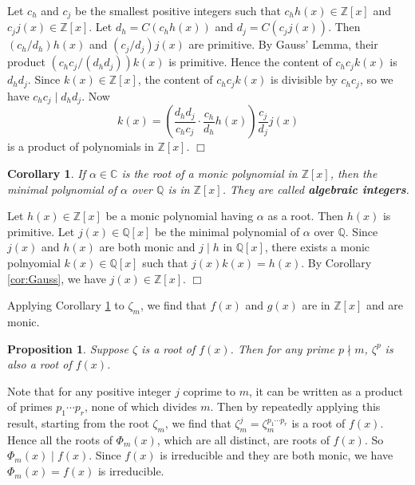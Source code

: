 \documentclass{article}
\def\Z{{\mathbb Z}}
\def\Q{{\mathbb Q}}
\def\Z{{\mathbb Z}}
\def\Q{{\mathbb Q}}
\def\C{{\mathbb C}}
\newtheorem{cor}[subsection]{Corollary}
\newtheorem{proposition}[subsection]{Proposition}
\newenvironment{proof}{\noindent {\bf Proof:}}{$\Box$ \vspace{2 ex}}
\begin{document}
\begin{proof}
    Let $c_h$ and $c_j$ be the smallest positive integers such that $c_hh(x)\in\Z[x]$ and $c_jj(x)\in\Z[x]$. Let $d_h = C(c_hh(x))$ and $d_j = C(c_jj(x))$. Then $(c_h/d_h)h(x)$ and $(c_j/d_j)j(x)$ are primitive. By Gauss' Lemma, their product $(c_hc_j/(d_hd_j))k(x)$ is primitive. Hence the content of $c_hc_jk(x)$ is $d_hd_j$. Since $k(x)\in\Z[x]$, the content of $c_hc_jk(x)$ is divisible by $c_hc_j$, so we have $c_hc_j \mid d_h d_j$. Now
    $$k(x) = \left(\frac{d_hd_j}{c_hc_j} \cdot \frac{c_h}{d_h}h(x)\right) \frac{c_j}{d_j}j(x)$$
    is a product of polynomials in $\Z[x]$.
\end{proof}

\begin{cor}\label{cor:alg}
    If $\alpha\in\C$ is the root of a monic polynomial in $\Z[x]$, then the minimal polynomial of $\alpha$ over $\Q$ is in $\Z[x]$. They are called \textbf{algebraic integers}.
\end{cor}

\begin{proof}
    Let $h(x)\in\Z[x]$ be a monic polynomial having $\alpha$ as a root. Then $h(x)$ is primitive. Let $j(x)\in\Q[x]$ be the minimal polynomial of $\alpha$ over $\Q$. Since $j(x)$ and $h(x)$ are both monic and $j\mid h$ in $\Q[x]$, there exists a monic polnyomial $k(x)\in\Q[x]$ such that $j(x)k(x) = h(x)$. By Corollary \ref{cor:Gauss}, we have $j(x)\in\Z[x]$.
\end{proof}

Applying Corollary \ref{cor:alg} to $\zeta_m$, we find that $f(x)$ and $g(x)$ are in $\Z[x]$ and are monic.

\begin{proposition}\label{prop:zeta^p}
    Suppose $\zeta$ is a root of $f(x)$. Then for any prime $p\nmid m$, $\zeta^p$ is also a root of $f(x)$.
\end{proposition}

Note that for any positive integer $j$ coprime to $m$, it can be written as a product of primes $p_1\cdots p_r$, none of which divides $m$. Then by repeatedly applying this result, starting from the root $\zeta_m$, we find that $\zeta_m^j = \zeta_m^{p_1\cdots p_r}$ is a root of $f(x)$. Hence all the roots of $\Phi_m(x)$, which are all distinct, are roots of $f(x)$. So $\Phi_m(x) \mid f(x)$. Since $f(x)$ is irreducible and they are both monic, we have $\Phi_m(x) = f(x)$ is irreducible.
\end{document}
